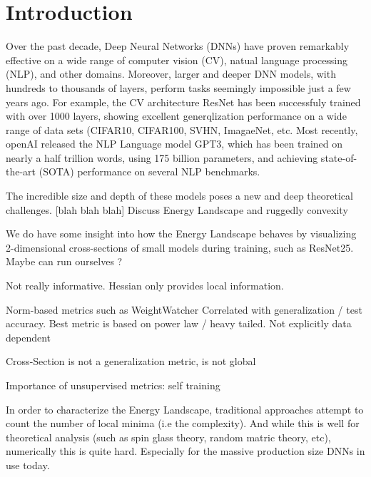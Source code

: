 \section{Introduction}
\label{sxn:intro}

Over the past decade, Deep Neural Networks (DNNs) have proven remarkably effective on a wide range of 
computer vision (CV), natual language processing (NLP), and other domains.  
Moreover, larger and deeper DNN models, with hundreds to thousands of layers, perform tasks
seemingly impossible just a few years ago.  
For example, the CV architecture ResNet has been successfuly trained with over 1000 layers,
showing excellent generqlization performance on a wide range of data sets (CIFAR10, CIFAR100, SVHN, ImagaeNet, etc.
Most recently, openAI released the NLP Language model GPT3, which has been trained on nearly a half trillion words,
using 175 billion parameters, and achieving state-of-the-art (SOTA) performance on several NLP
benchmarks.  

The incredible size and depth of these models poses a new and deep theoretical challenges.
[blah blah blah]
Discuss Energy Landscape and  ruggedly convexity



We do have some insight into how the Energy Landscape behaves by visualizing 2-dimensional
cross-sections of small models during training, such as ResNet25.
Maybe can run ourselves ?

Not really informative.  Hessian only provides local information.


Norm-based metrics such as WeightWatcher
Correlated with generalization / test accuracy.
Best metric is based on power law / heavy tailed.
Not explicitly data dependent



Cross-Section is not a generalization metric, is not global

Importance of unsupervised metrics: self training


In order to characterize the Energy Landscape, traditional approaches attempt to count
the number of local minima (i.e the complexity).  And while this is well for theoretical
analysis (such as spin glass theory, random matric theory, etc), numerically this
is quite hard.  Especially for the massive production size DNNs in use today.

